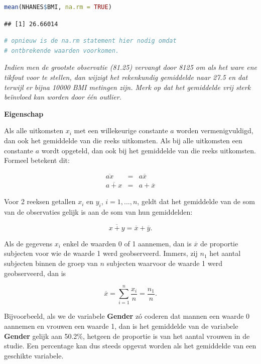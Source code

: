 \documentclass[
  12pt,dutch,coursenotes]{book}
\theoremstyle{definition}
\theoremstyle{definition}
\theoremstyle{definition}
\theoremstyle{definition}
\theoremstyle{remark}
\begin{document}
\begin{lstlisting}[language=R]
mean(NHANES$BMI, na.rm = TRUE)
\end{lstlisting}

\begin{lstlisting}
## [1] 26.66014
\end{lstlisting}

\begin{lstlisting}[language=R]
# opnieuw is de na.rm statement hier nodig omdat
# ontbrekende waarden voorkomen.
\end{lstlisting}

\emph{Indien men de grootste observatie (81.25) vervangt door 8125 om als het ware ene tikfout voor te stellen, dan wijzigt het rekenkundig gemiddelde naar 27.5 en dat terwijl er bijna 10000 BMI metingen zijn. Merk op dat het gemiddelde vrij sterk beïnvloed kan worden door één outlier.}

\textbf{Eigenschap}

Als alle uitkomsten \(x_i\) met een willekeurige constante \(a\)
worden vermenigvuldigd, dan ook het gemiddelde van die reeks uitkomsten. Als
bij alle uitkomsten een constante \(a\) wordt opgeteld, dan ook bij het
gemiddelde van die reeks uitkomsten. Formeel betekent dit:

\begin{eqnarray*}
\overline{ax} &= &a \overline{x} \\
\overline{a + x} &= &a + \overline{x}
\end{eqnarray*}

Voor 2 reeksen getallen \(x_i\) en \(y_i\), \(i=1,...,n\), geldt dat het
gemiddelde van de som van de observaties gelijk is aan de som van hun
gemiddelden:

\begin{equation*}
\overline{x + y} = \overline{x} + \overline{y}.
\end{equation*}

Als de gegevens \(x_i\) enkel de waarden 0 of 1 aannemen, dan is \(\overline{x}\)
de proportie subjecten voor wie de waarde 1 werd geobserveerd. Immers, zij \(n_1\) het aantal subjecten binnen de groep van \(n\) subjecten waarvoor de
waarde 1 werd geobserveerd, dan is

\begin{equation*}
\overline{x}= \sum_{i=1}^n \frac{x_i}{n} = \frac{n_1}{n}.
\end{equation*}

Bijvoorbeeld, als we de variabele \textbf{Gender} zó
coderen dat mannen een waarde 0 aannemen en vrouwen een waarde 1, dan is het
gemiddelde van de variabele \textbf{Gender} gelijk aan 50.2\%, hetgeen de proportie is van het aantal vrouwen in de studie. Een percentage kan dus
steeds opgevat worden als het gemiddelde van een geschikte variabele.
\end{document}
